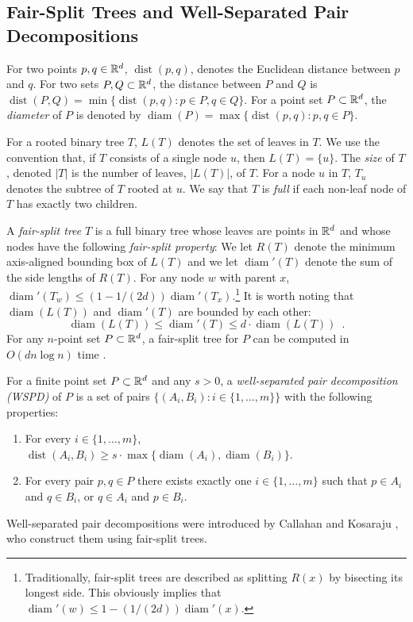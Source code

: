 \documentclass{patmorin}
\DeclareMathOperator{\diam}{diam}
\DeclareMathOperator{\dist}{dist}
\begin{document}
\subsection{Fair-Split Trees and Well-Separated Pair Decompositions}

For two points $p,q\in\mathbb{R}^d$, $\dist(p,q)$, denotes the Euclidean distance
between $p$ and $q$. For two sets $P,Q\subset\mathbb{R}^d$, the distance between
$P$ and $Q$ is $\dist(P,Q)=\min\{\dist(p,q):p\in P, q\in Q\}$.  For a
point set $P\subset\mathbb{R}^d$, the \emph{diameter} of $P$ is denoted by
$\diam(P)=\max\{\dist(p,q):p,q\in P\}$.

For a rooted binary tree $T$, $L(T)$ denotes the set of leaves in
$T$. We use the convention that, if $T$ consists of a single node $u$,
then $L(T)=\{u\}$. The \emph{size} of $T$, denoted $|T|$ is the number of
leaves, $|L(T)|$, of $T$. For a node $u$ in $T$, $T_u$ denotes the subtree
of $T$ rooted at $u$.  We say that $T$ is \emph{full} if each non-leaf
node of $T$ has exactly two children.

A \emph{fair-split tree} $T$ is a full binary tree whose leaves are
points in $\mathbb{R}^d$ and whose nodes have the following \emph{fair-split
property}: We let $R(T)$ denote the minimum axis-aligned bounding
box of $L(T)$ and we let $\diam'(T)$ denote the sum of the side
lengths of $R(T)$.  For any node $w$ with parent $x$, $\diam'(T_w)
\le (1-1/(2d))\diam'(T_x)$.\footnote{Traditionally, fair-split trees
are described as splitting $R(x)$ by bisecting its longest side.
This obviously implies that $\diam'(w)\le 1-(1/(2d))\diam'(x)$.} It is
worth noting that $\diam(L(T))$ and $\diam'(T)$ are bounded by each other:
\[
	\diam(L(T)) \le \diam'(T) \le d\cdot\diam(L(T)) \enspace .
\]	
For any $n$-point set $P\subset\mathbb{R}^d$, a fair-split tree for $P$ can be
computed in $O(dn\log n)$ time \cite{callahan.kosaraju:decomposition}.

For a finite point set $P\subset\mathbb{R}^d$ and any $s>0$, a
\emph{well-separated pair decomposition (WSPD)} of $P$ is a set of pairs
$\{(A_i,B_i):i\in\{1,\ldots,m\}\}$ with the following properties:
\begin{enumerate}
  \item For every $i\in\{1,\ldots,m\}$, 
    $\dist(A_i,B_i)\ge s\cdot\max\{\diam(A_i),\diam(B_i)\}$.
  \item For every pair $p,q\in P$ there exists exactly one
    $i\in\{1,\ldots,m\}$ such that $p\in A_i$ and $q\in B_i$, or $q\in A_i$
    and $p\in B_i$.
\end{enumerate}
Well-separated pair decompositions were introduced by Callahan and
Kosaraju \cite{callahan.kosaraju:decomposition}, who construct them
using fair-split trees.
\end{document}
